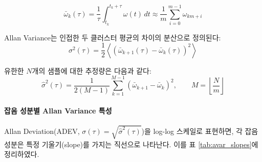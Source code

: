                 \begin{equation}
                    \bar{\omega}_k(\tau) = \frac{1}{\tau} \int_{t_k}^{t_k + \tau} \omega(t)\, dt
                    \approx \frac{1}{m} \sum_{i=0}^{m-1} \omega_{km+i}
                    \label{eq:cluster_avg}
                \end{equation}

                Allan Variance는 인접한 두 클러스터 평균의 차이의 분산으로 정의된다:\\

                \begin{equation}
                    \sigma^2(\tau) = \frac{1}{2} \left\langle \left( \bar{\omega}_{k+1}(\tau) - \bar{\omega}_k(\tau) \right)^2 \right\rangle
                    \label{eq:avar_def}
                \end{equation}

                유한한 $N$개의 샘플에 대한 추정량은 다음과 같다:\\

                \begin{equation}
                    \hat{\sigma}^2(\tau) = \frac{1}{2(M-1)} \sum_{k=1}^{M-1} \left( \bar{\omega}_{k+1} - \bar{\omega}_k \right)^2, \qquad M = \left\lfloor \frac{N}{m} \right\rfloor
                    \label{eq:avar_estimate}
                \end{equation}

            \paragraph{잡음 성분별 Allan Variance 특성}
                Allan Deviation(ADEV, $\sigma(\tau) = \sqrt{\hat{\sigma}^2(\tau)}$)을 log-log 스케일로 표현하면, 각 잡음 성분은 특정 기울기(slope)를 가지는 직선으로 나타난다. 이를 표 \ref{tab:avar_slopes}에 정리하였다.\\

